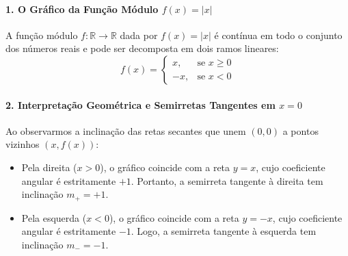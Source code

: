 \paragraph*{1. O Gráfico da Função Módulo $f(x) = |x|$}

\noindent
A função módulo $f\colon \mathbb{R} \to \mathbb{R}$ dada por $f(x) = |x|$ é contínua em todo o conjunto dos números reais e pode ser decomposta em dois ramos lineares:
\[
f(x) = \begin{cases}
x, & \text{se } x \ge 0 \\
-x, & \text{se } x < 0
\end{cases}
\]

\begin{center}
\end{center}

\vspace{0.3cm}

\paragraph*{2. Interpretação Geométrica e Semirretas Tangentes em $x = 0$}

\noindent
Ao observarmos a inclinação das retas secantes que unem $(0, 0)$ a pontos vizinhos $(x, f(x))$:
\begin{itemize}[noitemsep, topsep=3pt]
    \item Pela direita ($x > 0$), o gráfico coincide com a reta $y = x$, cujo coeficiente angular é estritamente $+1$. Portanto, a semirreta tangente à direita tem inclinação $m_+ = +1$.
    \item Pela esquerda ($x < 0$), o gráfico coincide com a reta $y = -x$, cujo coeficiente angular é estritamente $-1$. Logo, a semirreta tangente à esquerda tem inclinação $m_- = -1$.
\end{itemize}

